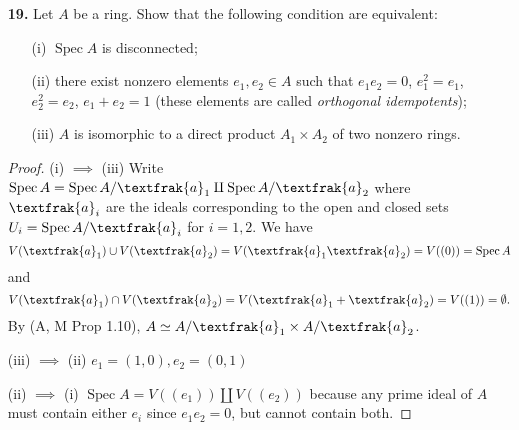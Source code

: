 \documentclass{article}
\newcommand{\goth}[1]{\textfrak{#1}}
\DeclareMathOperator{\spec}{Spec}
\begin{document}
\begin{enumerate} [label=\textbf{\arabic*.}, leftmargin=0em]
\item[\textbf{19.}] Let $A$ be a ring. Show that the following condition are equivalent:
\begin{itemize}
    \item[(i)] $\spec{A}$ is disconnected;
    \item[(ii)] there exist nonzero elements $e_1, e_2 \in A$ such that $e_1 e_2 = 0$, $e_1^2 = e_1$, $e_2^2 = e_2$, $e_1 + e_2 = 1$ (these elements are called \textit{orthogonal idempotents});
    \item[(iii)] $A$ is isomorphic to a direct product $A_1 \times A_2$ of two nonzero rings.
\end{itemize}

\begin{proof}
    (i) $\implies$ (iii) Write $\spec{A} = \spec{A/\goth{a}_1} \amalg \spec{A/\goth{a}_2}$ where $\goth{a}_i$ are the ideals corresponding to the open and closed sets $U_i = \spec{A/\goth{a}_i}$ for $i = 1, 2$. We have $$V(\goth{a}_1) \cup V(\goth{a}_2) = V(\goth{a}_1 \goth{a}_2 ) = V((0)) = \spec{A}$$ and $$V(\goth{a}_1) \cap V(\goth{a}_2) = V(\goth{a}_1 + \goth{a}_2)= V((1)) = \emptyset.$$ By (A, M Prop 1.10), $A \simeq A/\goth{a}_1 \times A/\goth{a}_2$.

    (iii) $\implies$ (ii) $e_1 = (1, 0), e_2 = (0, 1)$

    (ii) $\implies$ (i) $\spec{A} = V((e_1)) \amalg V((e_2))$ because any prime ideal of $A$ must contain either $e_i$ since $e_1 e_2 = 0$, but cannot contain both.
\end{proof}

\end{enumerate}
\end{document}
